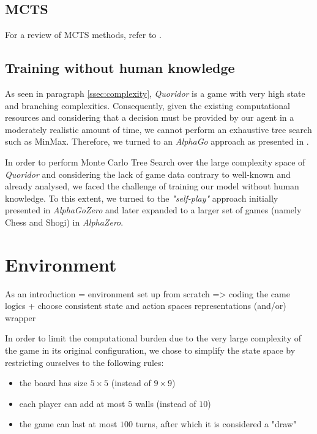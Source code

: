 \documentclass[journal, a4paper]{IEEEtran}
\begin{document}
\subsection{MCTS}
\label{ssec:mcts}

For a review of MCTS methods, refer to \cite{mcts-review}.

\subsection{Training without human knowledge}
\label{ssec:human-knowledge}

As seen in paragraph \ref{ssec:complexity}, \textit{Quoridor} is a game with very high state and branching complexities. Consequently, given the existing computational resources and considering that a decision must be provided by our agent in a moderately realistic amount of time, we cannot perform an exhaustive tree search such as MinMax. Therefore, we turned to an \textit{AlphaGo} approach as presented in \cite{alphago}.

In order to perform Monte Carlo Tree Search over the large complexity space of \textit{Quoridor} and considering the lack of game data contrary to well-known and already analysed, we faced the challenge of training our model without human knowledge. To this extent, we turned to the \textit{"self-play"} approach initially presented in  \textit{AlphaGoZero}\cite{alphagozero} and later expanded to a larger set of games (namely Chess and Shogi) in \textit{AlphaZero}\cite{alphazero}.

\section{Environment}
\label{sec:environment}

As an introduction = environment set up from scratch => coding the came logics + choose consistent state and action spaces representations (and/or) wrapper

In order to limit the computational burden due to the very large complexity of the game in its original configuration, we chose to simplify the state space by restricting ourselves to the following rules:
\begin{itemize}
    \item the board has size $5\times 5$ (instead of $9\times 9$)
    \item each player can add at most $5$ walls (instead of $10$)
    \item the game can last at most $100$ turns, after which it is considered a "draw"
\end{itemize}
\end{document}
